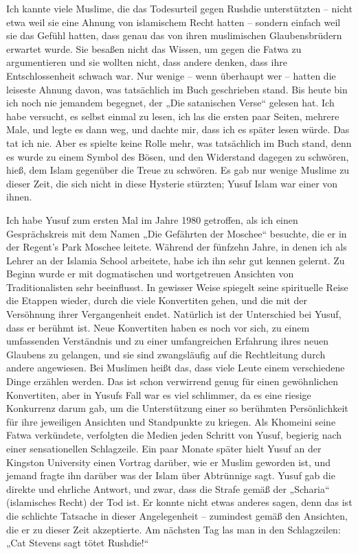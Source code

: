 \documentclass[12pt]{memoir}
\begin{document}
Ich kannte viele Muslime, die das Todesurteil gegen Rushdie unterstützten –
nicht etwa weil sie eine Ahnung von islamischem Recht hatten –
sondern einfach weil sie das Gefühl hatten,
dass genau das von ihren muslimischen Glaubensbrüdern erwartet wurde.
Sie besaßen nicht das Wissen, um gegen die Fatwa zu argumentieren
und sie wollten nicht, dass andere denken,
dass ihre Entschlossenheit schwach war.
Nur wenige – wenn überhaupt wer – hatten die leiseste Ahnung davon,
was tatsächlich im Buch geschrieben stand.
Bis heute bin ich noch nie jemandem begegnet,
der „Die satanischen Verse“ gelesen hat.
Ich habe versucht, es selbst einmal zu lesen,
ich las die ersten paar Seiten, mehrere Male, und legte es dann weg,
und dachte mir, dass ich es später lesen würde.
Das tat ich nie.
Aber es spielte keine Rolle mehr, was tatsächlich im Buch stand,
denn es wurde zu einem Symbol des Bösen,
und den Widerstand dagegen zu schwören, hieß,
dem Islam gegenüber die Treue zu schwören.
Es gab nur wenige Muslime zu dieser Zeit,
die sich nicht in diese Hysterie stürzten;
Yusuf Islam war einer von ihnen.

Ich habe Yusuf zum ersten Mal im Jahre 1980 getroffen,
als ich einen Gesprächskreis mit dem Namen
„Die Gefährten der Moschee“ besuchte,
die er in der Regent’s Park Moschee leitete.
Während der fünfzehn Jahre,
in denen ich als Lehrer an der Islamia School arbeitete,
habe ich ihn sehr gut kennen gelernt.
Zu Beginn wurde er mit dogmatischen und wortgetreuen Ansichten
von Traditionalisten sehr beeinflusst.
In gewisser Weise spiegelt seine spirituelle Reise die Etappen wieder,
durch die viele Konvertiten gehen,
und die mit der Versöhnung ihrer Vergangenheit endet.
Natürlich ist der Unterschied bei Yusuf, dass er berühmt ist.
Neue Konvertiten haben es noch vor sich,
zu einem umfassenden Verständnis und zu einer umfangreichen Erfahrung
ihres neuen Glaubens zu gelangen,
und sie sind zwangsläufig auf die Rechtleitung durch andere angewiesen.
Bei Muslimen heißt das,
dass viele Leute einem verschiedene Dinge erzählen werden.
Das ist schon verwirrend genug für einen gewöhnlichen Konvertiten,
aber in Yusufs Fall war es viel schlimmer,
da es eine riesige Konkurrenz darum gab,
um die Unterstützung einer so berühmten Persönlichkeit
für ihre jeweiligen Ansichten und Standpunkte zu kriegen.
Als Khomeini seine Fatwa verkündete,
verfolgten die Medien jeden Schritt von Yusuf,
begierig nach einer sensationellen Schlagzeile.
Ein paar Monate später hielt Yusuf
an der Kingston University einen Vortrag darüber,
wie er Muslim geworden ist, und jemand fragte ihn
darüber was der Islam über Abtrünnige sagt.
Yusuf gab die direkte und ehrliche Antwort, und zwar,
dass die Strafe gemäß der „Scharia“ (islamisches Recht) der Tod ist.
Er konnte nicht etwas anderes sagen,
denn das ist die schlichte Tatsache in dieser Angelegenheit –
zumindest gemäß den Ansichten, die er zu dieser Zeit akzeptierte.
Am nächsten Tag las man in den Schlagzeilen:
„Cat Stevens sagt tötet Rushdie!“
\end{document}
